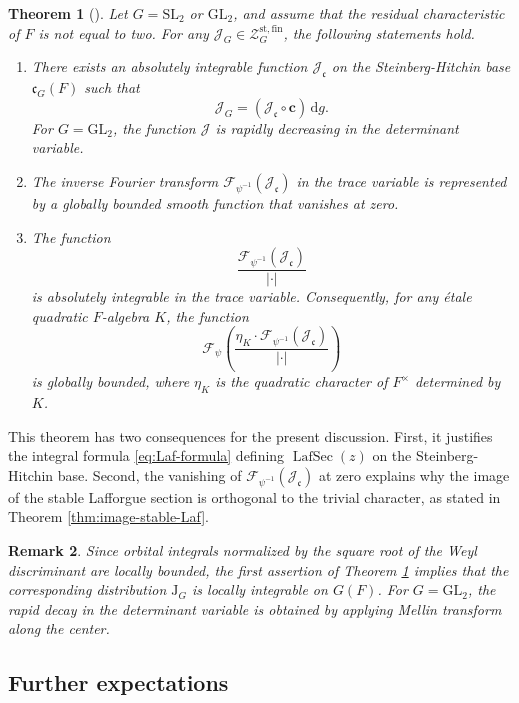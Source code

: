 \documentclass[iccmp]{ipbook}
\newcommand{\CF}{{\mathcal {F}}}
\newcommand{\CJ}{{\mathcal {J}}}
\newcommand{\CZ}{{\mathcal {Z}}}
\newcommand{\Fc}{{\mathfrak {c}}}
\newcommand{\RJ}{{\mathrm {J}}}
\newcommand{\GL}{{\mathrm{GL}}}
\newcommand{\SL}{{\mathrm{SL}}}
\newcommand{\st}{{\mathrm{st}}}
\newcommand{\ud}{\,\mathrm{d}}
\newcommand{\LafSec}{\operatorname{LafSec}}
\newcommand{\fin}{\mathrm{fin}}
\newtheorem{thm}{Theorem}[subsection]
\newtheorem{rmk}[thm]{Remark}
\def\bc{\mathbf{c}}
\begin{document}
\begin{thm}[{\cite[Thm.~5.5.1]{LN}}]\label{thm:analytic-J}
Let $G=\SL_2$ or $\GL_2$, and assume that the residual characteristic of $F$ is not equal
to two. For any $\CJ_G\in \CZ_G^{\st,\fin}$, the following statements hold.
\begin{enumerate}
\item There exists an absolutely integrable function $\CJ_\Fc$ on the Steinberg-Hitchin base
$\Fc_G(F)$ such that
\[
\CJ_G=(\CJ_\Fc\circ \bc)\ud g.
\]
For $G=\GL_2$, the function $\CJ$ is rapidly decreasing in the determinant variable.

\item The inverse Fourier transform $\CF_{\psi^{-1}}(\CJ_\Fc)$ in the trace variable is represented
by a globally bounded smooth function that vanishes at zero.

\item The function
\[
\frac{\CF_{\psi^{-1}}(\CJ_\Fc)}{|\cdot|}
\]
is absolutely integrable in the trace variable. Consequently, for any \'{e}tale quadratic
$F$-algebra $K$, the function
\[
\CF_\psi\left(
\frac{\eta_K\cdot \CF_{\psi^{-1}}(\CJ_\Fc)}{|\cdot|}
\right)
\]
is globally bounded, where $\eta_K$ is the quadratic character of $F^\times$ determined by $K$.
\end{enumerate}
\end{thm}

This theorem has two consequences for the present discussion. First, it justifies the integral
formula \eqref{eq:Laf-formula} defining $\LafSec(z)$ on the Steinberg-Hitchin base. Second,
the vanishing of $\CF_{\psi^{-1}}(\CJ_\Fc)$ at zero explains why the image of the stable
Lafforgue section is orthogonal to the trivial character, as stated in Theorem
\ref{thm:image-stable-Laf}.

\begin{rmk}
Since orbital integrals normalized by the square root of the Weyl discriminant are locally
bounded, the first assertion of Theorem \ref{thm:analytic-J} implies that the corresponding
distribution $\RJ_G$ is locally integrable on $G(F)$. For $G=\GL_2$, the rapid decay in the
determinant variable is obtained by applying Mellin transform along the center.
\end{rmk}

\subsection{Further expectations}\label{subsec:Laf-expectations}
\end{document}
